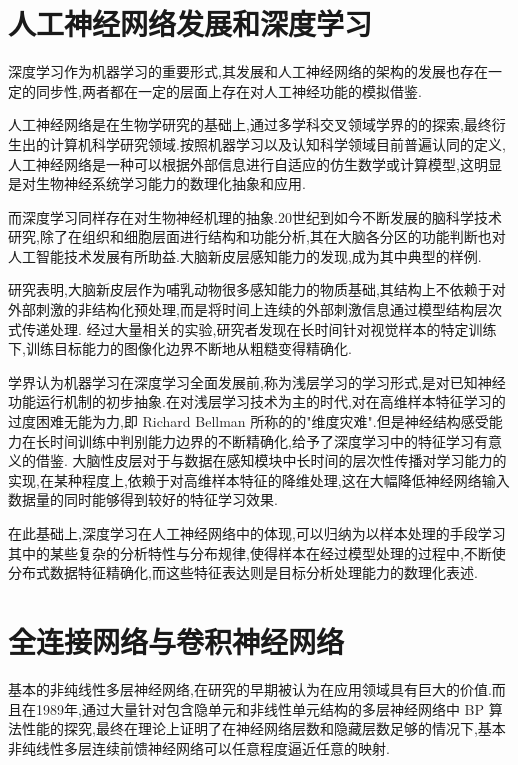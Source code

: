 \section{人工神经网络发展和深度学习}
深度学习作为机器学习的重要形式,其发展和人工神经网络的架构的发展也存在一定的同步性,两者都在一定的层面上存在对人工神经功能的模拟借鉴.

人工神经网络是在生物学研究的基础上,通过多学科交叉领域学界的的探索,最终衍生出的计算机科学研究领域.按照机器学习以及认知科学领域目前普遍认同的定义,人工神经网络是一种可以根据外部信息进行自适应的仿生数学或计算模型,这明显是对生物神经系统学习能力的数理化抽象和应用.

而深度学习同样存在对生物神经机理的抽象.20世纪到如今不断发展的脑科学技术研究,除了在组织和细胞层面进行结构和功能分析,其在大脑各分区的功能判断也对人工智能技术发展有所助益.大脑新皮层感知能力的发现,成为其中典型的样例.

研究表明,大脑新皮层作为哺乳动物很多感知能力的物质基础,其结构上不依赖于对外部刺激的非结构化预处理,而是将时间上连续的外部刺激信息通过模型结构层次式传递处理\cite{xuke13}. 经过大量相关的实验,研究者发现在长时间针对视觉样本的特定训练下,训练目标能力的图像化边界不断地从粗糙变得精确化\cite{xuke15}.

学界认为机器学习在深度学习全面发展前,称为浅层学习的学习形式,是对已知神经功能运行机制的初步抽象\cite{deeplearning1,qiancengxuexi}.在对浅层学习技术为主的时代,对在高维样本特征学习的过度困难无能为力,即 Richard Bellman 所称的的"维度灾难".但是神经结构感受能力在长时间训练中判别能力边界的不断精确化,给予了深度学习中的特征学习有意义的借鉴. 大脑性皮层对于与数据在感知模块中长时间的层次性传播对学习能力的实现,在某种程度上,依赖于对高维样本特征的降维处理\cite{xuke17},这在大幅降低神经网络输入数据量的同时能够得到较好的特征学习效果\cite{cnnyoushi2}.




在此基础上,深度学习在人工神经网络中的体现,可以归纳为以样本处理的手段学习其中的某些复杂的分析特性与分布规律,使得样本在经过模型处理的过程中,不断使分布式数据特征精确化,而这些特征表达则是目标分析处理能力的数理化表述.

\section{全连接网络与卷积神经网络}
基本的非纯线性多层神经网络,在研究的早期被认为在应用领域具有巨大的价值.而且在1989年,通过大量针对包含隐单元和非线性单元结构的多层神经网络中 BP 算法性能的探究,最终在理论上证明了在神经网络层数和隐藏层数足够的情况下,基本非纯线性多层连续前馈神经网络可以任意程度逼近任意的映射.

